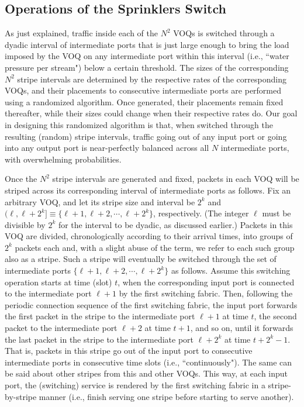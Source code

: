 \subsection{Operations of the Sprinklers Switch}


As just explained, traffic inside each of the $N^2$ VOQs is switched through
a dyadic interval of intermediate ports that is just large enough to bring the load imposed by the VOQ on any intermediate port 
within this interval (i.e., ``water pressure per stream") below a certain threshold.  
The sizes of the corresponding $N^2$ stripe intervals are determined by the respective rates of the corresponding VOQs,
and their placements to consecutive intermediate ports are performed using a randomized algorithm.
Once generated, their placements remain fixed thereafter, while their sizes 
could change when their respective rates do.
Our goal in designing this randomized algorithm is that, 
when switched through the resulting (random) stripe intervals,  
traffic going out of any input port or going into any output port is near-perfectly balanced 
across all $N$ intermediate ports, with overwhelming probabilities.  


Once the $N^2$ stripe intervals are generated and fixed, packets in each VOQ will be striped across its
corresponding interval of intermediate ports as follows.  
Fix an arbitrary VOQ, and let its stripe size and interval be $2^k$ and $(\ell, \ell+2^k]
\equiv \{\ell+1, \ell+2, \cdots, \ell+2^k\}$, respectively.
(The integer $\ell$ must be divisible by $2^k$ for the interval to be dyadic, as discussed earlier.)
Packets in this VOQ are divided, chronologically according to their arrival times, 
into groups of $2^k$ packets each and,
with a slight abuse of the term, we refer to each such group also as a stripe.  Such a
stripe will eventually be switched through the set of intermediate ports $\{\ell+1, \ell+2, \cdots, \ell+2^k\}$
as follows. Assume this switching operation starts at time (slot) $t$, when the corresponding input port 
is connected to the intermediate port $\ell+1$ by the first switching fabric.  Then, following the periodic connection 
sequence of the first switching fabric, the input port forwards the first packet in the stripe to 
the intermediate port $\ell+1$ at time $t$, the second packet to the intermediate port $\ell+2$ at time $t + 1$, and so on,
until it forwards the last packet in the stripe to the intermediate port $\ell+2^k$ at time $t+ 2^k -1$.  That is, packets in this stripe
go out of the input port to consecutive intermediate ports in consecutive time slots (i.e., ``continuously").  The same can be said about other stripes from this and other VOQs.
This way, at each input port, the (switching) service is rendered by the first switching fabric in a stripe-by-stripe manner (i.e., finish serving 
one stripe before starting to serve another).   








